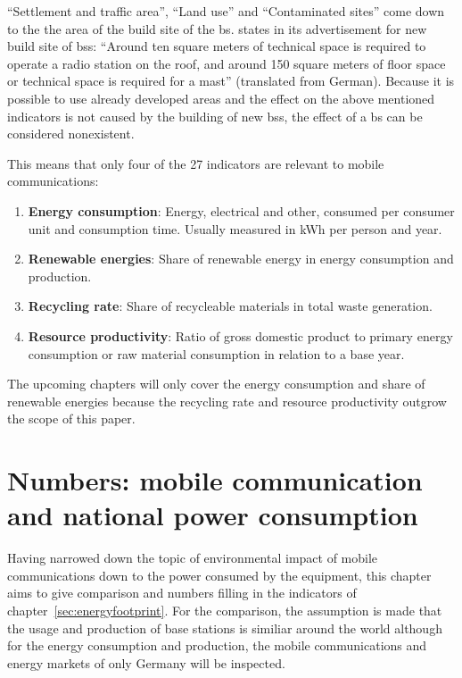 \documentclass[11pt,a4paper]{article}
\begin{document}
\enquote{Settlement and traffic area}, \enquote{Land use} and \enquote{Contaminated sites} come down to the the area of the build site of the \acrshort{bs}.
\citep{BSStandort} states in its advertisement for new build site of \acrshort{bs}s: \enquote{Around ten square meters of technical space is required to operate a radio station on the roof, and around 150 square meters of floor space or technical space is required for a mast} (translated from German).
Because it is possible to use already developed areas and the effect on the above mentioned indicators is not caused by the building of new \acrshort{bs}s, the effect of a \acrshort{bs} can be considered nonexistent.

This means that only four of the 27 indicators are relevant to mobile communications:
\begin{enumerate}
  \item \textbf{Energy consumption}: Energy, electrical and other, consumed per consumer unit and consumption time. Usually measured in kWh per person and year.
  \item \textbf{Renewable energies}: Share of renewable energy in energy consumption and production.
  \item \textbf{Recycling rate}: Share of recycleable materials in total waste generation.
  \item \textbf{Resource productivity}: Ratio of gross domestic product to primary energy consumption or raw material consumption in relation to a base year.
\end{enumerate}

The upcoming chapters will only cover the energy consumption and share of renewable energies because the recycling rate and resource productivity outgrow the scope of this paper.

\section{Numbers: mobile communication and national power consumption}\label{sec:influence}

Having narrowed down the topic of environmental impact of mobile communications down to the power consumed by the equipment, this chapter aims to give comparison and numbers filling in the indicators of chapter~\ref{sec:energyfootprint}.
For the comparison, the assumption is made that the usage and production of base stations is similiar around the world although for the energy consumption and production, the mobile communications and energy markets of only Germany will be inspected. 
\end{document}
